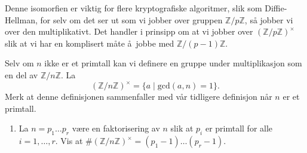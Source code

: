 \begin{remark}
    Denne isomorfien er viktig for flere kryptografiske algoritmer,
    slik som Diffie-Hellman,
    for selv om det ser ut som vi jobber over gruppen $\mathbb Z / p\mathbb Z$,
    så jobber vi over den multiplikativt.
    Det handler i prinsipp om at vi jobber over ${(\mathbb Z / p\mathbb Z)}^\times$
    slik at vi har en komplisert måte å jobbe med $\mathbb Z / (p - 1)\mathbb Z$.
\end{remark}

Selv om $n$ ikke er et primtall kan vi definere en gruppe under multiplikasjon
som en del av $\mathbb Z / n\mathbb Z$.
La
\[
    {(\mathbb Z / n\mathbb Z)}^\times
    = \{ a\mid \mathrm{gcd}(a, n) = 1\}.
\]
Merk at denne definisjonen sammenfaller med vår
tidligere definisjon når $n$ er et primtall.
\begin{enumerate}[resume]
    \item La $n = p_1\dots p_r$ være en faktorisering av $n$
        slik at $p_i$ er primtall for alle $i=1,\dots,r$.
        Vis at $\# {(\mathbb Z / n\mathbb Z)}^\times = (p_1 - 1)\dots(p_r - 1)$.
\end{enumerate}
